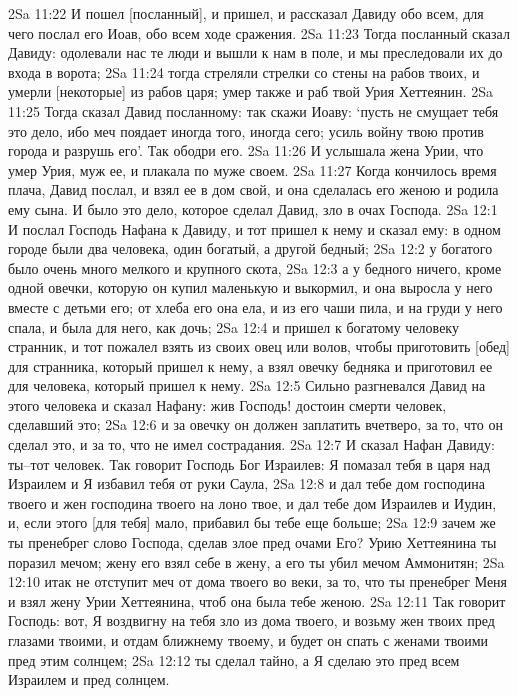2Sa 11:22  И пошел [посланный], и пришел, и рассказал Давиду обо всем, для чего послал его Иоав, обо всем ходе сражения.
2Sa 11:23  Тогда посланный сказал Давиду: одолевали нас те люди и вышли к нам в поле, и мы преследовали их до входа в ворота;
2Sa 11:24  тогда стреляли стрелки со стены на рабов твоих, и умерли [некоторые] из рабов царя; умер также и раб твой Урия Хеттеянин.
2Sa 11:25  Тогда сказал Давид посланному: так скажи Иоаву: `пусть не смущает тебя это дело, ибо меч поядает иногда того, иногда сего; усиль войну твою против города и разрушь его'. Так ободри его.
2Sa 11:26  И услышала жена Урии, что умер Урия, муж ее, и плакала по муже своем.
2Sa 11:27  Когда кончилось время плача, Давид послал, и взял ее в дом свой, и она сделалась его женою и родила ему сына. И было это дело, которое сделал Давид, зло в очах Господа.
2Sa 12:1  И послал Господь Нафана к Давиду, и тот пришел к нему и сказал ему: в одном городе были два человека, один богатый, а другой бедный;
2Sa 12:2  у богатого было очень много мелкого и крупного скота,
2Sa 12:3  а у бедного ничего, кроме одной овечки, которую он купил маленькую и выкормил, и она выросла у него вместе с детьми его; от хлеба его она ела, и из его чаши пила, и на груди у него спала, и была для него, как дочь;
2Sa 12:4  и пришел к богатому человеку странник, и тот пожалел взять из своих овец или волов, чтобы приготовить [обед] для странника, который пришел к нему, а взял овечку бедняка и приготовил ее для человека, который пришел к нему.
2Sa 12:5  Сильно разгневался Давид на этого человека и сказал Нафану: жив Господь! достоин смерти человек, сделавший это;
2Sa 12:6  и за овечку он должен заплатить вчетверо, за то, что он сделал это, и за то, что не имел сострадания.
2Sa 12:7  И сказал Нафан Давиду: ты--тот человек. Так говорит Господь Бог Израилев: Я помазал тебя в царя над Израилем и Я избавил тебя от руки Саула,
2Sa 12:8  и дал тебе дом господина твоего и жен господина твоего на лоно твое, и дал тебе дом Израилев и Иудин, и, если этого [для тебя] мало, прибавил бы тебе еще больше;
2Sa 12:9  зачем же ты пренебрег слово Господа, сделав злое пред очами Его? Урию Хеттеянина ты поразил мечом; жену его взял себе в жену, а его ты убил мечом Аммонитян;
2Sa 12:10  итак не отступит меч от дома твоего во веки, за то, что ты пренебрег Меня и взял жену Урии Хеттеянина, чтоб она была тебе женою.
2Sa 12:11  Так говорит Господь: вот, Я воздвигну на тебя зло из дома твоего, и возьму жен твоих пред глазами твоими, и отдам ближнему твоему, и будет он спать с женами твоими пред этим солнцем;
2Sa 12:12  ты сделал тайно, а Я сделаю это пред всем Израилем и пред солнцем.
